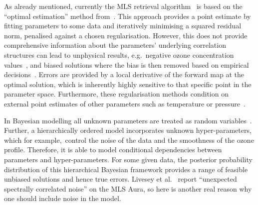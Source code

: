 As already mentioned, currently the MLS retrieval algorithm~\cite{livesey2006retrieval} is based on the ``optimal estimation'' method from~\cite{rodgers1976retrieval}.
This approach provides a point estimate by fitting parameters to some data and iteratively minimising a squared residual norm, penalised against a chosen regularisation.
However, this does not provide comprehensive information about the parameters' underlying correlation structures can lead to unphysical results, e.g.~negative ozone concentration values~\cite{MLSdata}, and biased solutions where the bias is then removed based on empirical decisions~\cite{livesey2008ozonecarbonmono, Froidevaux2008snrozone}.
Errors are provided by a local derivative of the forward map at the optimal solution, which is inherently highly sensitive to that specific point in the parameter space.
Furthermore, these regularisation methods condition on external point estimates of other parameters such as temperature or pressure~\cite{livesey2006retrieval}.

In Bayesian modelling all unknown parameters are treated as random variables~\cite{kaipio2005statinv}.
Further, a hierarchically ordered model incorporates unknown hyper-parameters, which for example,~control the noise of the data and the smoothness of the ozone profile.
Therefore, it is able to model conditional dependencies between parameters and hyper-parameters.
For some given data, the posterior probability distribution of this hierarchical Bayesian framework provides a range of feasible unbiased solutions and hence true errors.
Livesey et al.~\cite{livesey2006retrieval} report ``unexpected spectrally correlated noise'' on the MLS Aura, so here is another real reason why one should include noise in the model.

